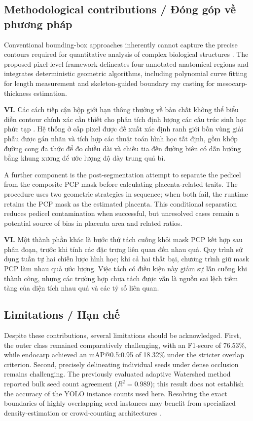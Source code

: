 \documentclass[final,1p,11pt,longtitle]{elsarticle}
\newenvironment{viet}{\par\smallskip\begingroup\color{viColor}\noindent\textbf{VI. }\ignorespaces}{\par\endgroup\smallskip}
\begin{document}
\subsection*{Methodological contributions / {\color{viColor} Đóng góp về phương pháp}}
Conventional bounding-box approaches inherently cannot capture the precise contours required for quantitative analysis of complex biological structures \cite{instance,gedil}. The proposed pixel-level framework delineates four annotated anatomical regions and integrates deterministic geometric algorithms, including polynomial curve fitting for length measurement and skeleton-guided boundary ray casting for mesocarp-thickness estimation.

\begin{viet}
Các cách tiếp cận hộp giới hạn thông thường về bản chất không thể biểu diễn contour chính xác cần thiết cho phân tích định lượng các cấu trúc sinh học phức tạp \cite{instance,gedil}. Hệ thống ở cấp pixel được đề xuất xác định ranh giới bốn vùng giải phẫu được gán nhãn và tích hợp các thuật toán hình học tất định, gồm khớp đường cong đa thức để đo chiều dài và chiếu tia đến đường biên có dẫn hướng bằng khung xương để ước lượng độ dày trung quả bì.
\end{viet}


A further component is the post-segmentation attempt to separate the pedicel from the composite PCP mask before calculating placenta-related traits. The procedure uses two geometric strategies in sequence; when both fail, the runtime retains the PCP mask as the estimated placenta. This conditional separation reduces pedicel contamination when successful, but unresolved cases remain a potential source of bias in placenta area and related ratios.

\begin{viet}
Một thành phần khác là bước thử tách cuống khỏi mask PCP kết hợp sau phân đoạn, trước khi tính các đặc trưng liên quan đến nhau quả. Quy trình sử dụng tuần tự hai chiến lược hình học; khi cả hai thất bại, chương trình giữ mask PCP làm nhau quả ước lượng. Việc tách có điều kiện này giảm sự lẫn cuống khi thành công, nhưng các trường hợp chưa tách được vẫn là nguồn sai lệch tiềm tàng của diện tích nhau quả và các tỷ số liên quan.
\end{viet}


\subsection*{Limitations / {\color{viColor} Hạn chế}}
Despite these contributions, several limitations should be acknowledged. First, the outer class remained comparatively challenging, with an F1-score of 76.53\%, while endocarp achieved an mAP@0.5:0.95 of 18.32\% under the stricter overlap criterion. Second, precisely delineating individual seeds under dense occlusion remains challenging. The previously evaluated adaptive Watershed method reported bulk seed count agreement ($R^2=0.989$); this result does not establish the accuracy of the YOLO instance counts used here. Resolving the exact boundaries of highly overlapping seed instances may benefit from specialized density-estimation or crowd-counting architectures \cite{x}.
\end{document}
